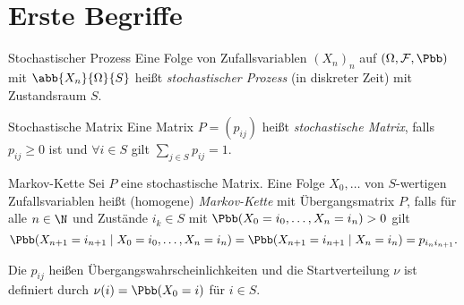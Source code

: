 \section{Erste Begriffe}

\begin{karte}{Stochastischer Prozess}
    Eine Folge von Zufallsvariablen \((X_n)_n\) auf 
    \((\Omega, \mathcal{F}, \Pbb)\) mit 
    \( \abb{X_n}{\Omega}{S} \) heißt \textit{stochastischer Prozess} 
    (in diskreter Zeit) mit Zustandsraum \(S\).
\end{karte}

\begin{karte}{Stochastische Matrix}
    Eine Matrix \(P = (p_{ij})\) heißt \textit{stochastische Matrix}, 
    falls \(p_{ij} \geq 0\) ist und \( \forall i \in S \) gilt 
    \( \sum_{j\in S} p_{ij} = 1 \).
\end{karte}

\begin{karte}{Markov-Kette}
    Sei \(P\) eine stochastische Matrix. 
    Eine Folge \(X_0, \ldots\) von \(S\)-wertigen 
    Zufallsvariablen heißt (homogene) \textit{Markov-Kette} 
    mit Übergangsmatrix \(P\), falls für alle \(n\in\N\) 
    und Zustände \(i_k\in S\) mit \( \Pbb(X_0 = i_0, \ldots, X_n = i_n) > 0 \) 
    gilt 
    \[ \Pbb(X_{n+1} = i_{n+1} \;|\; X_0 = i_0, \ldots, X_n = i_n) 
    = \Pbb(X_{n+1} = i_{n+1} \;|\; X_n = i_n) = p_{i_n i_{n+1}}. \]

    Die \(p_{ij}\) heißen Übergangswahrscheinlichkeiten und die 
    Startverteilung \(\nu\) ist definiert durch \(\nu(i) = \Pbb(X_0 = i)\) 
    für \(i\in S\).
\end{karte}